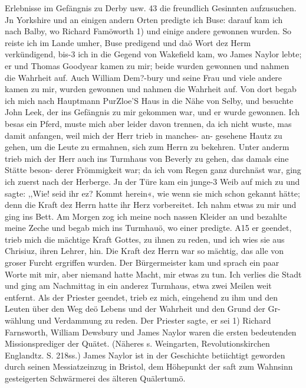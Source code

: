 Erlebnisse im Gefängnis zu Derby usw. 43
die freundlich Gesinnten aufzusuchen. Jn Yorkshire und an einigen
andern Orten predigte ich Buse: darauf kam ich nach Balby,
wo Richard Famöworth 1) und einige andere gewonnen wurden.
So reiste ich im Lande umher, Buse predigend und daö Wort
dez Herm verkündigend, bis-3 ich in die Gegend von Wakefield
kam, wo James Naylor lebte; er und Thomas Goodyear
kamen zu mir; beide wurden gewonnen und nahmen die Wahrheit
auf. Auch William Dem?-bury und seine Frau und viele andere
kamen zu mir, wurden gewonnen und nahmen die Wahrheit auf.
Von dort begab ich mich nach Hauptmann PurZloe’S Haus in
die Nähe von Selby, und besuchte John Leek, der ins Gefängnis
zu mir gekommen war, und er wurde gewonnen. Ich besas ein
Pferd, muste mich aber leider davon trennen, da ich nicht wuste,
mas damit anfangen, weil mich der Herr trieb in manches- an-
gesehene Hautz zu gehen, um die Leute zu ermahnen, sich zum
Herrn zu bekehren. Unter anderm trieb mich der Herr auch ins
Turmhaus von Beverly zu gehen, das damals eine Stätte beson-
derer Frömmigkeit war; da ich vom Regen ganz durchnäst war,
ging ich zuerst nach der Herberge. Jn der Türe kam ein junge-3
Weib auf mich zu und sagte: ,,Wie! seid ihr ez? Kommt herein«,
wie wenn sie mich schon gekannt hätte; denn die Kraft dez Herrn
hatte ihr Herz vorbereitet. Ich nahm etwas zu mir und ging
ins Bett. Am Morgen zog ich meine noch nassen Kleider an
und bezahlte meine Zeche und begab mich ins Turmhauö, wo
einer predigte. A15 er geendet, trieb mich die mächtige Kraft Gottes,
zu ihnen zu reden, und ich wies sie aus Chrisiuz, ihren Lehrer, hin.
Die Kraft dez Herrn war so mächtig, das alle von groser Furcht
ergriffen wurden. Der Bürgermeister kam und sprach ein paar
Worte mit mir, aber niemand hatte Macht, mir etwas zu tun.
Ich verlies die Stadt und ging am Nachmittag in ein anderez
Turmhaus, etwa zwei Meilen weit entfernt. Als der Priester
geendet, trieb ez mich, eingehend zu ihm und den Leuten über
den Weg deö Lebens und der Wahrheit und den Grund der Gr-
wählung und Verdammung zu reden. Der Priester sagte, er sei
1) Richard Farnsworth, William Dewsbury und James Naylor waren
die ersten bedeutenden Missionsprediger der Quätet. (Näheres s. Weingarten,
Revolutionskirchen Englandtz. S. 218ss.) James Naylor ist in der Geschichte
betiichtigt geworden durch seinen Messiatzeinzug in Bristol, dem Höhepunkt der
saft zum Wahnsinn gesteigerten Schwärmerei des älteren Quälertumö.


